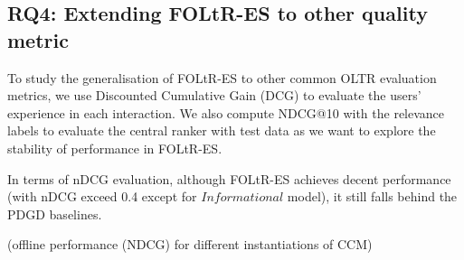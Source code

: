 
%
%


\subsection{RQ4: Extending FOLtR-ES to other quality metric}


To study the generalisation of FOLtR-ES to other common OLTR evaluation metrics, we use Discounted Cumulative Gain (DCG) to evaluate the users' experience in each interaction. We also compute NDCG@10 with the relevance labels to evaluate the central ranker with test data as we want to explore the stability of  performance in FOLtR-ES.

In terms of nDCG evaluation, although FOLtR-ES achieves decent performance (with nDCG exceed 0.4 except for $Informational$ model), it still falls behind the PDGD baselines.



(offline performance (NDCG) for different instantiations of CCM)